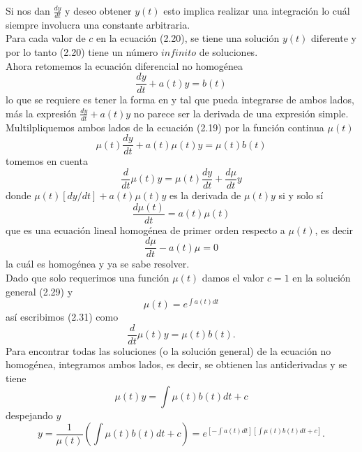 \documentclass[10pt,a4paper,notitlepage]{report}
\begin{document}
\begin{itemize}
Si nos dan $\frac{dy}{dt}$ y deseo obtener $y(t)$ esto implica realizar una integración lo cuál siempre involucra una constante arbitraria. \\
Para cada valor de $c$ en la ecuación (2.20), se tiene una solución $y(t)$ diferente y por lo tanto (2.20) tiene un número $infinito$ de soluciones. \\
Ahora retomemos la ecuación diferencial no homogénea
\begin{equation}
\frac{dy}{dt} + a(t) y = b(t)
\end{equation}
lo que se requiere es tener la forma en y tal que  pueda integrarse de ambos lados, más la expresión $\frac{dy}{dt} + a(t) y$ no parece ser la derivada de una expresión simple. \\
Multilpliquemos ambos lados de la ecuación (2.19) por la función continua $\mu(t)$
\begin{equation}
\mu (t) \frac{dy}{dt} + a(t) \mu(t) y = \mu(t) b(t) 
\end{equation}
tomemos en cuenta
\begin{equation}
\frac{d}{dt} \mu(t) y = \mu (t) \frac{dy}{dt} + \frac{d\mu}{dt} y
 \end{equation}
 donde $\mu(t) [dy/ dt] + a(t) \mu(t)y$ es la derivada de $\mu(t) y$ si y solo sí 
 \begin{equation}
 \frac{d\mu (t)}{dt} = a(t) \mu(t)
 \end{equation}
 que es una ecuación lineal homogénea de primer orden respecto a $\mu(t)$, es decir
 \begin{equation}
 \frac{d\mu}{dt} - a(t) \mu = 0
 \end{equation}
 la cuál es homogénea y ya se sabe resolver.\\
Dado que solo requerimos una función $\mu(t)$ damos el valor $c=1$ en la solución general (2.29) y
\begin{equation}
\mu(t) = e^{\int a(t) dt}
\end{equation}
 así escribimos (2.31) como
 \begin{equation}
 \frac{d}{dt} \mu(t) y = \mu(t) b(t).
 \end{equation}
 Para encontrar todas las soluciones (o la solución general) de la ecuación no homogénea, integramos ambos lados, es decir, se obtienen las antiderivadas y se tiene
 \begin{equation}
\mu(t) y = \int \mu(t)b(t) dt + c
 \end{equation}
 despejando $y$
 \begin{equation} 
y = \frac{1}{\mu(t)} \left( \int \mu(t) b(t) dt + c \right) = e^{[- \int a(t) dt] [\int \mu(t) b(t) dt + c]}.

\end{equation}
\end{itemize}
\end{document}
